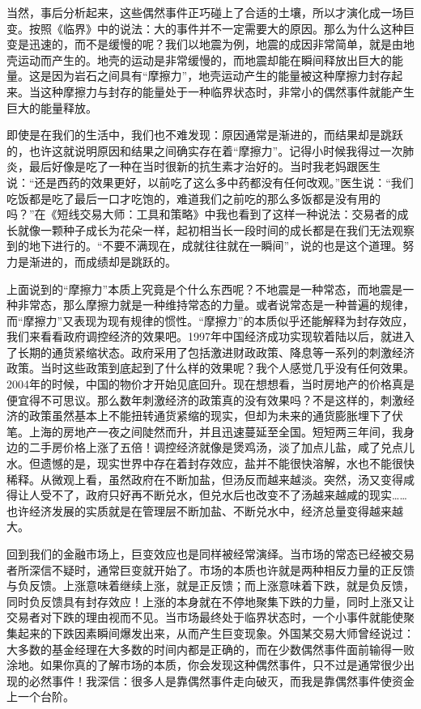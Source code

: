 当然，事后分析起来，这些偶然事件正巧碰上了合适的土壤，所以才演化成一场巨变。按照《临界》中的说法：大的事件并不一定需要大的原因。那么为什么这种巨变是迅速的，而不是缓慢的呢？我们以地震为例，地震的成因非常简单，就是由地壳运动而产生的。地壳的运动是非常缓慢的，而地震却能在瞬间释放出巨大的能量。这是因为岩石之间具有“摩擦力”，地壳运动产生的能量被这种摩擦力封存起来。当这种摩擦力与封存的能量处于一种临界状态时，非常小的偶然事件就能产生巨大的能量释放。

即使是在我们的生活中，我们也不难发现：原因通常是渐进的，而结果却是跳跃的，也许这就说明原因和结果之间确实存在着“摩擦力”。记得小时候我得过一次肺炎，最后好像是吃了一种在当时很新的抗生素才治好的。当时我老妈跟医生说：“还是西药的效果更好，以前吃了这么多中药都没有任何改观。”医生说：“我们吃饭都是吃了最后一口才吃饱的，难道我们之前吃的那么多饭都是没有用的吗？”在《短线交易大师：工具和策略》中我也看到了这样一种说法：交易者的成长就像一颗种子成长为花朵一样，起初相当长一段时间的成长都是在我们无法观察到的地下进行的。“不要不满现在，成就往往就在一瞬间”，说的也是这个道理。努力是渐进的，而成绩却是跳跃的。

上面说到的“摩擦力”本质上究竟是个什么东西呢？不地震是一种常态，而地震是一种非常态，那么摩擦力就是一种维持常态的力量。或者说常态是一种普遍的规律，而“摩擦力”又表现为现有规律的惯性。“摩擦力”的本质似乎还能解释为封存效应，我们来看看政府调控经济的效果吧。1997年中国经济成功实现软着陆以后，就进入了长期的通货紧缩状态。政府采用了包括激进财政政策、降息等一系列的刺激经济政策。当时这些政策到底起到了什么样的效果呢？我个人感觉几乎没有任何效果。2004年的时候，中国的物价才开始见底回升。现在想想看，当时房地产的价格真是便宜得不可思议。那么数年刺激经济的政策真的没有效果吗？不是这样的，刺激经济的政策虽然基本上不能扭转通货紧缩的现实，但却为未来的通货膨胀埋下了伏笔。上海的房地产一夜之间陡然而升，并且迅速蔓延至全国。短短两三年间，我身边的二手房价格上涨了五倍！调控经济就像是煲鸡汤，淡了加点儿盐，咸了兑点儿水。但遗憾的是，现实世界中存在着封存效应，盐并不能很快溶解，水也不能很快稀释。从微观上看，虽然政府在不断加盐，但汤反而越来越淡。突然，汤又变得咸得让人受不了，政府只好再不断兑水，但兑水后也改变不了汤越来越咸的现实……也许经济发展的实质就是在管理层不断加盐、不断兑水中，经济总量变得越来越大。

回到我们的金融市场上，巨变效应也是同样被经常演绎。当市场的常态已经被交易者所深信不疑时，通常巨变就开始了。市场的本质也许就是两种相反力量的正反馈与负反馈。上涨意味着继续上涨，就是正反馈；而上涨意味着下跌，就是负反馈，同时负反馈具有封存效应！上涨的本身就在不停地聚集下跌的力量，同时上涨又让交易者对下跌的理由视而不见。当市场最终处于临界状态时，一个小事件就能使聚集起来的下跌因素瞬间爆发出来，从而产生巨变现象。外国某交易大师曾经说过：大多数的基金经理在大多数的时间内都是正确的，而在少数偶然事件面前输得一败涂地。如果你真的了解市场的本质，你会发现这种偶然事件，只不过是通常很少出现的必然事件！我深信：很多人是靠偶然事件走向破灭，而我是靠偶然事件使资金上一个台阶。

